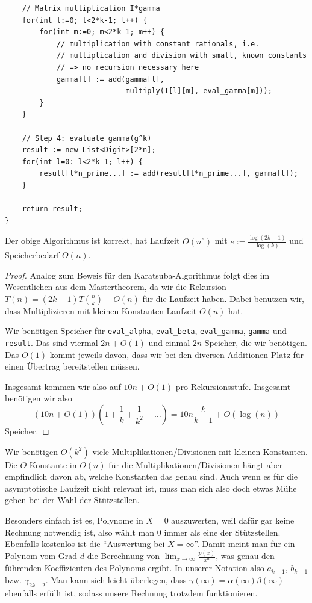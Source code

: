 \begin{algorithm}
\begin{lstlisting}
    // Matrix multiplication I*gamma
    for(int l:=0; l<2*k-1; l++) {
        for(int m:=0; m<2*k-1; m++) {
            // multiplication with constant rationals, i.e.
            // multiplication and division with small, known constants
            // => no recursion necessary here
            gamma[l] := add(gamma[l],
                            multiply(I[l][m], eval_gamma[m]));
        }
    }

    // Step 4: evaluate gamma(g^k)
    result := new List<Digit>[2*n];
    for(int l=0: l<2*k-1; l++) {
        result[l*n_prime...] := add(result[l*n_prime...], gamma[l]);
    }

    return result;
}
    \end{lstlisting}
\end{algorithm}

\begin{proposition}
    Der obige Algorithmus ist korrekt, hat Laufzeit $O(n^e)$ mit $e:=\frac{\log(2k-1)}{\log(k)}$ und Speicherbedarf $O(n)$.
\end{proposition}
\begin{proof}
    Analog zum Beweis für den Karatsuba-Algorithmus folgt dies im Wesentlichen aus dem Mastertheorem, da wir die Rekursion $T(n) = (2k-1)T(\frac{n}{k})+O(n)$ für die Laufzeit haben. Dabei benutzen wir, dass Multiplizieren mit kleinen Konstanten Laufzeit $O(n)$ hat.

    Wir benötigen Speicher für \texttt{eval\_alpha}, \texttt{eval\_beta}, \texttt{eval\_gamma}, \texttt{gamma} und \texttt{result}. Das sind viermal $2n+O(1)$ und einmal $2n$ Speicher, die wir benötigen. Das $O(1)$ kommt jeweils davon, dass wir bei den diversen Additionen Platz für einen Übertrag bereitstellen müssen.

    Insgesamt kommen wir also auf $10n+O(1)$ pro Rekursionsstufe. Insgesamt benötigen wir also \[(10n+O(1))\left(1+\frac{1}{k}+\frac{1}{k^2}+\ldots\right) = 10n\frac{k}{k-1}+O(\log(n))\]
    Speicher.
\end{proof}

\begin{remark}
    Wir benötigen $O(k^2)$ viele Multiplikationen/Divisionen mit kleinen Konstanten. Die $O$-Konstante in $O(n)$ für die Multiplikationen/Divisionen hängt aber empfindlich davon ab, welche Konstanten das genau sind. Auch wenn es für die asymptotische Laufzeit nicht relevant ist, muss man sich also doch etwas Mühe geben bei der Wahl der Stützstellen.

    \smallskip
    Besonders einfach ist es, Polynome in $X=0$ auszuwerten, weil dafür gar keine Rechnung notwendig ist, also wählt man $0$ immer als eine der Stützstellen. Ebenfalls kostenlos ist die \enquote{Auswertung bei $X=\infty$}. Damit meint man für ein Polynom vom Grad $d$ die Berechnung von $\lim_{x\to\infty} \frac{p(x)}{x^d}$, was genau den führenden Koeffizienten des Polynoms ergibt. In unserer Notation also $a_{k-1}$, $b_{k-1}$ bzw. $\gamma_{2k-2}$. Man kann sich leicht überlegen, dass $\gamma(\infty)=\alpha(\infty)\beta(\infty)$ ebenfalls erfüllt ist, sodass unsere Rechnung trotzdem funktionieren.
\end{remark}

